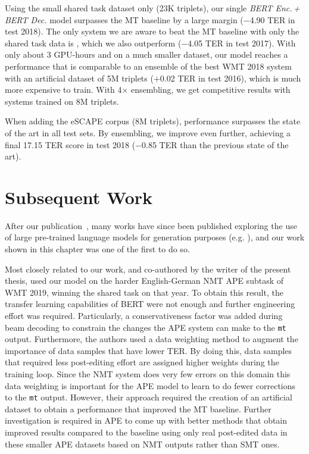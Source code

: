 Using the small shared task dataset only (23K triplets), our single
\emph{BERT Enc.\,+\,BERT Dec.} model surpasses the MT baseline by a
large margin ($-$4.90 TER in test 2018). The only system we are aware
to beat the MT baseline with only the shared task data is
\citet{berard2017lig}, which we also outperform ($-$4.05 TER in test
2017). With only about 3 GPU-hours and on a much smaller dataset, our
model reaches a performance that is comparable to an ensemble of the
best WMT 2018 system with an artificial dataset of 5M triplets
($+$0.02 TER in test 2016), which is much more expensive to train.
With 4$\times$ ensembling, we get competitive results with systems
trained on 8M triplets.

When adding the eSCAPE corpus (8M triplets), performance surpasses
the state of the art in all test sets. By ensembling, we improve even
further, achieving a final 17.15 TER score in test 2018 ($-$0.85 TER
than the previous state of the art).

\section{Subsequent Work}

After our publication~\citep{Correia2019}, many works have since been
published exploring the use of large pre-trained language models for
generation purposes (e.g.
\citep{zhang2019PretrainingBasedNaturalLanguage,
    chen2020DistillingKnowledgeLearned}), and our work shown in this
chapter was one of the first to do so. %

Most closely related to our work, and co-authored by the writer of
the present thesis, \citet{lopes2019unbabels} used our model on the
harder English-German NMT APE subtask of WMT 2019, winning the shared
task on that year. To obtain this result, the transfer learning
capabilities of BERT were not enough and further engineering effort
was required. Particularly, a conservativeness factor was added
during beam decoding to constrain the changes the APE system can make
to the {\tt mt} output. Furthermore, the authors used a data
weighting method to augment the importance of data samples that have
lower TER. By doing this, data samples that required less
post-editing effort are assigned higher weights during the training
loop. Since the NMT system does very few errors on this domain this
data weighting is important for the APE model to learn to do fewer
corrections to the {\tt mt} output. However, their approach required
the creation of an artificial dataset to obtain a performance that
improved the MT baseline. Further investigation is required in APE to
come up with better methods that obtain improved results compared to
the baseline using only real post-edited data in these smaller APE
datasets based on NMT outputs rather than SMT ones.

